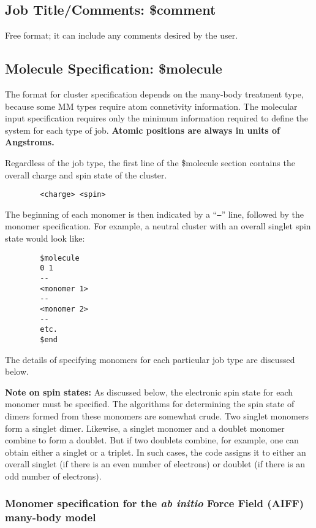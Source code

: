 \documentclass[11pt,letterpaper]{article}
\begin{document}
\begin{spacing}{1.0}
\subsection{Job Title/Comments: \$comment} 

	Free format; it can include any comments desired by the user.

\subsection{Molecule Specification: \$molecule}

The format for cluster specification depends on the many-body
treatment type, because some MM types require atom connetivity
information.  The molecular input specification requires only the
minimum information required to define the system for each
type of job.  {\bf Atomic positions are always in units of Angstroms.}

Regardless of the job type, the first line of the \$molecule section
contains the overall charge and spin state of the cluster.
\begin{verbatim}
        <charge> <spin>
\end{verbatim}
The beginning of each monomer is then indicated by a ``{\tt--}'' line,
followed by the monomer specification.  For example, a neutral cluster
with an overall singlet spin state would look like:

\begin{verbatim}
        $molecule
        0 1
        --
        <monomer 1>
        --
        <monomer 2>
        --
        etc.
        $end
\end{verbatim}
\noindent The details of specifying monomers for each particular job
type are discussed below.  

{\bf Note on spin states:} As discussed below, the electronic spin
state for each monomer must be specified.  The algorithms for
determining the spin state of dimers formed from these monomers are
somewhat crude.  Two singlet monomers form a singlet dimer.  Likewise,
a singlet monomer and a doublet monomer combine to form a doublet.
But if two doublets combine, for example, one can obtain either a
singlet or a triplet.  In such cases, the code assigns it to either an
overall singlet (if there is an even number of electrons) or doublet
(if there is an odd number of electrons).

 
\subsubsection{Monomer specification for the {\em ab initio} Force Field (AIFF) many-body model}


\end{spacing}
\end{document}
